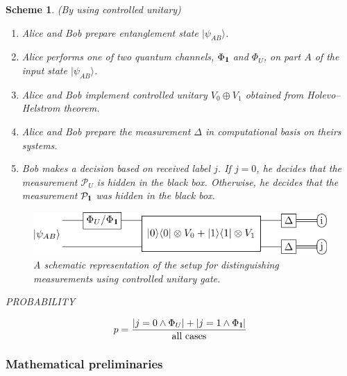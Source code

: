 \documentclass[preprint,12pt, a4paper]{elsarticle}
\newcommand{\ket}[1]{\ensuremath{|#1\rangle}}
\newcommand{\1}{{\rm 1\hspace{-0.9mm}l}}
\newcommand{\Id}{{\rm 1\hspace{-0.9mm}l}}
\newcommand{\PP}{\mathcal{P}}
\newtheorem{scheme}{Scheme}
\begin{document}
\begin{scheme}(By using controlled unitary)
	


	\begin{enumerate}
			\item Alice and Bob prepare entanglement state $\ket{\psi_{AB}}$.
		\item Alice performs one of two quantum channels, $\Phi_{\Id}$ and $\Phi_{U}$,  on part $A$ of the input 
		state  $\ket{\psi_{AB}}$.
		\item Alice and Bob implement controlled unitary $V_0 \oplus V_1$ obtained from Holevo--Helstrom theorem.	
		\item Alice and Bob prepare the measurement $\Delta$ in computational basis on theirs systems.
		\item Bob	makes a decision based on received label $j$. If $j=0$, he decides that the measurement $\PP_U$ is hidden in the black box. Otherwise, he decides that the measurement $\PP_{\Id}$ was hidden in the black box.  
		
	\end{enumerate}

\begin{figure}[h!]
	\centering 
	\includegraphics[scale=1.5]{pics/controlled_unitary} 
	
	\caption{ A schematic representation of the setup for distinguishing
		measurements using controlled unitary gate. 
	}\label{fig:controlled}
\end{figure} 


PROBABILITY 

\begin{equation}
p = \frac{|j=0 \wedge \Phi_{U} | + |j=1 \wedge \Phi_{\1}|}{\text{all 
		cases}}
\end{equation}

\end{scheme}




\subsubsection{Mathematical preliminaries}
\end{document}
